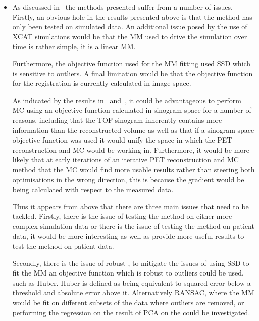         \begin{itemize}
            \item As discussed in~ the methods presented suffer from a number of issues. Firstly, an obvious hole in the results presented above is that the method has only been tested on simulated data. An additional issue posed by the use of \gls{XCAT} simulations would be that the \gls{MM} used to drive the simulation over time is rather simple, it is a linear \gls{MM}.
            
            Furthermore, the objective function used for the \gls{MM} fitting used \gls{SSD} which is sensitive to outliers. A final limitation would be that the objective function for the registration is currently calculated in image space.
            
            As indicated by the results in~ and~, it could be advantageous to perform \gls{MC} using an objective function calculated in sinogram space for a number of reasons, including that the \gls{TOF} sinogram inherently contains more information than the reconstructed volume as well as that if a sinogram space objective function was used it would unify the space in which the \gls{PET} reconstruction and \gls{MC} would be working in. Furthermore, it would be more likely that at early iterations of an iterative \gls{PET} reconstruction and \gls{MC} method that the \gls{MC} would find more usable results rather than steering both optimisations in the wrong direction, this is because the gradient would be being calculated with respect to the measured data.
            
            Thus it appears from above that there are three main issues that need to be tackled. Firstly, there is the issue of testing the method on either more complex simulation data or there is the issue of testing the method on patient data, it would be more interesting as well as provide more useful results to test the method on patient data.
            
            Secondly, there is the issue of robust , to mitigate the issues of using \gls{SSD} to fit the \gls{MM} an objective function which is robust to outliers could be used, such as Huber. Huber is defined as being equivalent to squared error below a threshold and absolute error above it. Alternatively \gls{RANSAC}, where the \gls{MM} would be fit on different subsets of the data where outliers are removed, or performing the regression on the result of \gls{PCA} on the  could be investigated.
            

\end{itemize}
